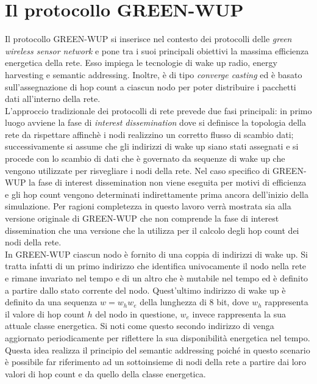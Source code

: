 \documentclass[binding=0.6cm,TFA]{sapthesis}
\begin{document}
\chapter{Il protocollo GREEN-WUP}

Il protocollo GREEN-WUP si inserisce nel contesto dei protocolli delle \emph{green wireless sensor network} e pone tra i suoi principali obiettivi
la massima efficienza energetica della rete. Esso impiega le tecnologie di wake up radio, energy harvesting e semantic addressing. Inoltre, è
di tipo \emph{converge casting} ed è basato sull'assegnazione di hop count a ciascun nodo per poter distribuire i pacchetti dati
all'interno della rete.\\

L'approccio tradizionale dei protocolli di rete prevede due fasi principali: in primo luogo avviene la fase di \emph{interest dissemination} dove si
definisce la topologia della rete da rispettare affinchè i nodi realizzino un corretto flusso di scambio dati; successivamente si assume che gli
indirizzi di wake up siano stati assegnati e si procede con lo scambio di dati che è governato da sequenze di wake up che vengono utilizzate per
risvegliare i nodi della rete. Nel caso specifico di GREEN-WUP la fase di interest dissemination non viene eseguita per motivi di efficienza
e gli hop count vengono determinati indirettamente prima ancora dell'inizio della simulazione. Per ragioni completezza in questo lavoro verrà
mostrata sia alla versione originale di GREEN-WUP che non comprende la fase di interest dissemination che una versione che la utilizza per
il calcolo degli hop count dei nodi della rete.\\

In GREEN-WUP ciascun nodo è fornito di una coppia di indirizzi di wake up. Si tratta infatti di un primo indirizzo che identifica univocamente
il nodo nella rete e rimane invariato nel tempo e di un altro che è mutabile nel tempo ed è definito a partire dallo stato corrente del nodo.
Quest'ultimo indirizzo di wake up è definito da una sequenza $w=w_{h}w_{e}$ della lunghezza di 8 bit, dove $w_{h}$ rappresenta il valore di hop
count $h$ del nodo in questione, $w_{e}$ invece rappresenta la sua attuale classe energetica. Si noti come questo secondo indirizzo di venga
aggiornato periodicamente per riflettere la sua disponibilità energetica nel tempo. Questa idea realizza il principio del semantic addressing
poiché in questo scenario è possibile far riferimento ad un sottoinsieme di nodi della rete a partire dai loro valori di hop count
e da quello della classe energetica. \\
\end{document}
